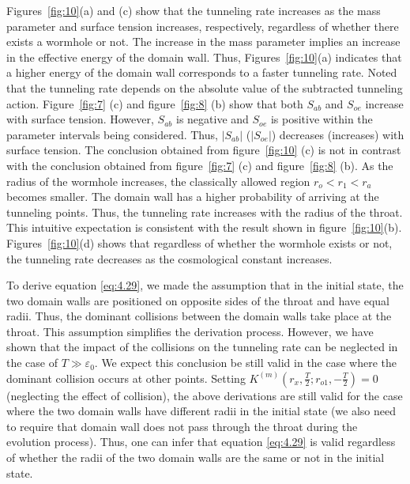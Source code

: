 \documentclass[12pt]{article}
\begin{document}
Figures~\ref{fig:10}(a) and (c) show that the tunneling rate increases as the mass parameter and surface tension increases, respectively, regardless of whether there exists a wormhole or not. The increase in the mass parameter implies an increase in the effective energy of the domain wall. Thus, Figures~\ref{fig:10}(a) indicates that a higher energy of the domain wall corresponds to a faster tunneling rate. Noted that the tunneling rate depends on the absolute value of the subtracted tunneling action. Figure~\ref{fig:7} (c) and figure~\ref{fig:8} (b) show that both $S_{ab}$ and $S_{oe}$ increase with surface tension. However, $S_{ab}$ is negative and $S_{oe}$ is positive within the parameter intervals being considered. Thus,  $|S_{ab}|$ ($|S_{oe}|$) decreases (increases) with surface tension. The conclusion obtained from figure~\ref{fig:10} (c) is not in contrast with the conclusion obtained from figure~\ref{fig:7} (c) and figure~\ref{fig:8} (b). As the radius of the wormhole increases, the classically allowed region $r_{o}<r_{1}<r_{a}$ becomes smaller. The domain wall has a higher probability of arriving at the tunneling points. Thus, the tunneling rate increases with the radius of the throat. This intuitive expectation is consistent with the result shown in figure~\ref{fig:10}(b). Figures~\ref{fig:10}(d) shows that regardless of whether the wormhole exists or not, the tunneling rate decreases as the cosmological constant increases.

To derive equation \eqref{eq:4.29}, we made the assumption that in the initial state, the two domain walls are positioned on opposite sides of the throat and have equal radii. Thus, the dominant collisions between the domain walls  take place at the throat. This assumption simplifies the derivation process. However, we have shown that the impact of the collisions on the tunneling rate can be neglected in the case of $T\gg\varepsilon_{0}$. We expect this conclusion be still valid in the case where the dominant collision occurs at other points.  Setting $K^{(m)}(r_{x},\frac{T}{2}; r_{o1}, -\frac{T}{2})=0$ (neglecting the effect of collision), the above derivations are still valid for the case where the two domain walls have different radii in the initial state  (we also need to require that domain wall \uppercase\expandafter{} does not pass through the throat during the evolution process). Thus, one can infer that equation \eqref{eq:4.29} is valid regardless of whether the radii of the two domain walls are the same or not in the initial state.
\end{document}
